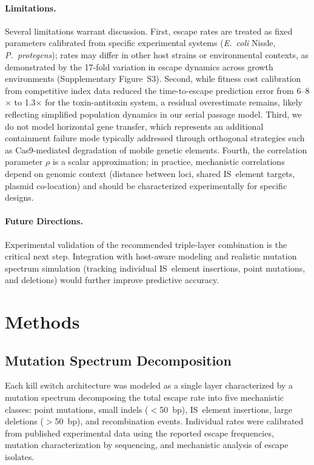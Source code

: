 \documentclass[journal=asbcd6,manuscript=article]{achemso}
\begin{document}
\paragraph{Limitations.}
Several limitations warrant discussion. First, escape rates are treated as fixed parameters calibrated from specific experimental systems (\textit{E.~coli} Nissle, \textit{P.~protegens}); rates may differ in other host strains or environmental contexts, as demonstrated by the 17-fold variation in escape dynamics across growth environments (Supplementary Figure~S3). Second, while fitness cost calibration from competitive index data reduced the time-to-escape prediction error from 6--8$\times$ to 1.3$\times$ for the toxin-antitoxin system, a residual overestimate remains, likely reflecting simplified population dynamics in our serial passage model. Third, we do not model horizontal gene transfer, which represents an additional containment failure mode typically addressed through orthogonal strategies such as Cas9-mediated degradation of mobile genetic elements\cite{Hayashi2024}. Fourth, the correlation parameter $\rho$ is a scalar approximation; in practice, mechanistic correlations depend on genomic context (distance between loci, shared IS~element targets, plasmid co-location) and should be characterized experimentally for specific designs.

\paragraph{Future Directions.}
Experimental validation of the recommended triple-layer combination is the critical next step. Integration with host-aware modeling\cite{Byrom2025} and realistic mutation spectrum simulation (tracking individual IS~element insertions, point mutations, and deletions) would further improve predictive accuracy.

\section{Methods}

\subsection{Mutation Spectrum Decomposition}
Each kill switch architecture was modeled as a single layer characterized by a mutation spectrum decomposing the total escape rate into five mechanistic classes: point mutations, small indels ($<$50~bp), IS~element insertions, large deletions ($>$50~bp), and recombination events. Individual rates were calibrated from published experimental data\cite{Rottinghaus2022,Chlebek2023,Williams2022} using the reported escape frequencies, mutation characterization by sequencing, and mechanistic analysis of escape isolates.
\end{document}
